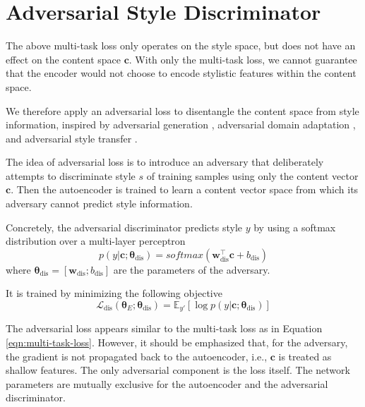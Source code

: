 \section{Adversarial Style Discriminator} \label{ssec:adversarial-style-objective}

The above multi-task loss only operates on the style space, but does not have an effect on the content space $\bm c$. With only the multi-task loss, we cannot guarantee that the encoder would not choose to encode stylistic features within the content space.

We therefore apply an adversarial loss to disentangle the content space from style information, inspired by adversarial generation \citep{goodfellow2014generative}, adversarial domain adaptation \citep{liu2017adversarial}, and adversarial style transfer \citep{fu2017style}.

The idea of adversarial loss is to introduce an adversary that deliberately attempts to discriminate style $s$ of training samples using only the content vector $\bm c$. Then the autoencoder is trained to learn a content vector space from which its adversary cannot predict style information.

Concretely, the adversarial discriminator predicts style $y$ by using a softmax distribution over a multi-layer perceptron
\begin{equation}
	p(y | \bm c; \bm\theta_\text{dis}) = softmax(\bm w_\text{dis}^\top \bm c + b_\text{dis})
\end{equation}
where $\bm\theta_\text{dis}=[\bm w_\text{dis}; b_\text{dis}]$ are the parameters of the adversary.

It is trained by minimizing the following objective
\begin{equation} \label{eqn:adv-disc-loss}
	\mathcal{L}_\text{dis}(\bm\theta_{E};\bm\theta_\text{dis}) =
	\mathbb{E}_{y'} [\log p(y | \bm c; \bm\theta_\text{dis})]
\end{equation}

The adversarial loss appears similar to the multi-task loss as in Equation \ref{eqn:multi-task-loss}. However, it should be emphasized that, for the adversary, the gradient is not propagated back to the autoencoder, i.e., $\bm c$ is treated as shallow features. The only adversarial component is the loss itself. The network parameters are mutually exclusive for the autoencoder and the adversarial discriminator.

